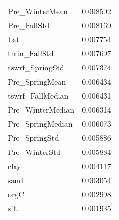 \begin{tabular}{lr}
Pre_WinterMean & 0.008502 \\
Pre_FallStd & 0.008169 \\
Lat & 0.007754 \\
tmin_FallStd & 0.007697 \\
tswrf_SpringStd & 0.007374 \\
Pre_SpringMean & 0.006434 \\
tswrf_FallMedian & 0.006431 \\
Pre_WinterMedian & 0.006314 \\
Pre_SpringMedian & 0.006073 \\
Pre_SpringStd & 0.005886 \\
Pre_WinterStd & 0.005884 \\
clay & 0.004117 \\
sand & 0.003054 \\
orgC & 0.002998 \\
silt & 0.001935 \\
\bottomrule
\end{tabular}
